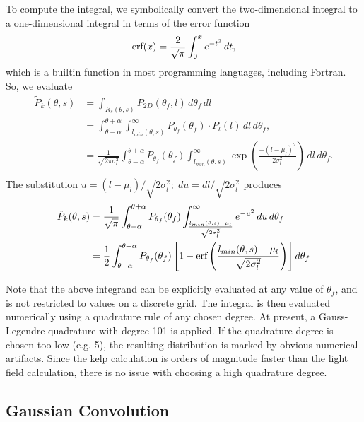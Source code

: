To compute the integral, we symbolically convert the two-dimensional integral to a one-dimensional integral in terms of the error function
\begin{equation}
  \mbox{erf}(x) = \frac{2}{\sqrt{\pi}} \int_0^x e^{-t^2}\, dt,
\end{equation}
which is a builtin function in most programming languages, including Fortran.
So, we evaluate
\begin{align*}
	\tilde{P}_k(\theta, s) &= \int_{R_s(\theta,s)}P_{2D}(\theta_f,l)\, d\theta_f\, dl \\
  &= \int_{\theta-\alpha}^{\theta+\alpha}
  \int_{l_{min}(\theta,s)}^{\infty}
  P_{\theta_f}(\theta_f) \cdot P_l(l)
  \, dl\, d\theta_f, \\
  &= \frac{1}{\sqrt{2\pi\sigma_l^2}}
  \int_{\theta-\alpha}^{\theta+\alpha}
  P_{\theta_f}(\theta_f)
  \int_{l_{min}(\theta,s)}^{\infty}
  \exp\left(\frac{-(l-\mu_l)^2}{2\sigma_l^2}\right)
  \, dl\, d\theta_f. \\
\end{align*}
The substitution $u=(l-\mu_l)/\sqrt{2\sigma_l^2};\; du=dl/\sqrt{2\sigma_l^2}$ produces
\begin{align*}
  \tilde{P}_k(\theta, s)
  &= \frac{1}{\sqrt{\pi}}
  \int_{\theta-\alpha}^{\theta+\alpha}
  P_{\theta_f}(\theta_f)
  \int_{\frac{l_{min}(\theta,s)-\mu_l}{\sqrt{2\sigma_l^2}}}^{\infty}
  e^{-u^{2}}\, du
  \, d\theta_f \\
  &= \frac{1}{2}
  \int_{\theta-\alpha}^{\theta+\alpha}
  P_{\theta_f}(\theta_f)
  \left[1 - \mbox{erf}\left(\frac{l_{min}(\theta,s)-\mu_l}{\sqrt{2\sigma_l^2}}\right)\right]
  d\theta_f
\end{align*}

Note that the above integrand can be explicitly evaluated at any value of $\theta_f$, and is not restricted to values on a discrete grid.
The integral is then evaluated numerically using a quadrature rule of any chosen degree.
At present, a Gauss-Legendre quadrature with degree 101 is applied.
If the quadrature degree is chosen too low (e.g. 5), the resulting distribution is marked by obvious numerical artifacts.
Since the kelp calculation is orders of magnitude faster than the light field calculation, there is no issue with choosing a high quadrature degree.

\subsection{Gaussian Convolution}

